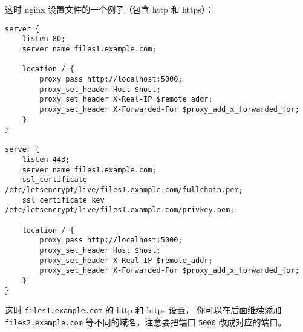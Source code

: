 这时 nginx 设置文件的一个例子（包含 http 和 https）：
\begin{lstlisting}[language=none]
server {
    listen 80;
    server_name files1.example.com;

    location / {
        proxy_pass http://localhost:5000;
        proxy_set_header Host $host;
        proxy_set_header X-Real-IP $remote_addr;
        proxy_set_header X-Forwarded-For $proxy_add_x_forwarded_for;
    }
}

server {
    listen 443;
    server_name files1.example.com;
    ssl_certificate /etc/letsencrypt/live/files1.example.com/fullchain.pem;
    ssl_certificate_key /etc/letsencrypt/live/files1.example.com/privkey.pem;

    location / {
        proxy_pass http://localhost:5000;
        proxy_set_header Host $host;
        proxy_set_header X-Real-IP $remote_addr;
        proxy_set_header X-Forwarded-For $proxy_add_x_forwarded_for;
    }
}
\end{lstlisting}
这时 \verb|files1.example.com| 的 http 和 https 设置， 你可以在后面继续添加 \verb|files2.example.com| 等不同的域名，注意要把端口 \verb|5000| 改成对应的端口。
